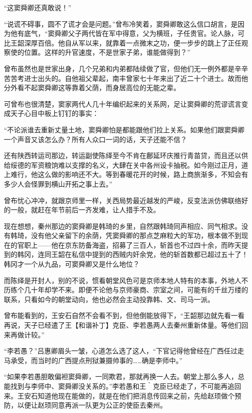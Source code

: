 “这窦舜卿还真敢说！”

“说谎不碍事，圆不了谎才会是问题。”曾布冷笑着，窦舜卿敢这么信口胡言，是因为他有底气，“窦舜卿父子两代皆在军中得意，父为横班，子任贵官。论人脉，可比王韶深厚百倍。他自从军以来，就靠着一点微末之功，便一步步的跳上了正任观察使的位置。这样的升官速度，不是世家子弟，谁能做得到？”

曾布虽然也是世家出身，几个兄弟和内弟都陆续做了官，但他们无一例外都是辛辛苦苦考进士出头的。自他祖父辈起，南丰曾家七十年来出了近二十个进士。故而他分外看不起窦舜卿这等靠着父荫，而身居高位的无能之辈。

可曾布也很清楚，窦家两代人几十年编织起来的关系网，足让窦舜卿的荒谬谎言变成天子心目中板上钉钉的事实：

“不论派谁去重新丈量土地，窦舜卿怕是都能跟他们拉上关系。如果他们跟窦舜卿一个声音又该怎么办？所有人众口一词的话，天子还能不信？

还有陕西转运司那边，转运副使陈绎至今不肯在鄜延环庆推行青苗贷，而且还以供给绥德的军资粮饷难以支撑的名义，大肆在关中各州设卡抽税。如今刚过正月，道上难行，他这么做的影响还不大。等到春暖花开的时候，路上商旅渐多，不知会有多少人会怪罪到横山开拓之事上去。”

曾布忧心冲冲，就跟京师里一样，关西局势最近越发的严峻，反变法派仿佛联络好的一般，就赶在年节前后一齐发难，让人措手不及。

现在想想，秦州那边的窦舜卿是韩琦的乡里，自然跟韩琦同声相应、同气相求。没有韩琦，没有他父亲留下的余荫，凭窦舜卿的那点芝麻粒大的军功，根本做不到现在的官职上——他在京东防备海盗，招募了三百人，斩首也不过四十余，而昨天提到的韩冈，连同王韶在私信中提到的西贼内奸余党，他的斩首数都已超过五十了！韩冈才一个从九品，可窦舜卿又是什么地位？

而陈绎是开封人，别的不说，惯看朝堂风色可是京师本地人特有的本事，外地人不历练个几十年却学不来。即便不论他与京师豪商、宗室之间，可能有的千丝万缕的联系，只看如今的朝堂动向，他也必然会主动投靠韩、文、司马一派。

曾布能看到的，王安石自然不会看不到，但他倒能放得下，“王韶那边就先看一看再说，天子已经遣了王【和谐补丁】克臣、李若愚两人去秦州重新体量。等他们回来再做计较。”

“李若愚？”吕惠卿眉头一皱，心道怎么选了这人，“下官记得他曾经在广西任过走马承受，而当时的广西提点刑狱兼摄帅事的……确是李师中。”

“如果李若愚胆敢偏袒窦舜卿，一同欺君，那就再换一人去。朝堂上那么多人，总能找到与李师中、窦舜卿没关系的。”李若愚和王｀克臣已经走了，不可能再追回来。王安石知道他现在能做的，就是在他们把消息传回来之前，先给赵顼做个预防，以便让赵顼同意再派一队更为公正的使臣去秦州。

